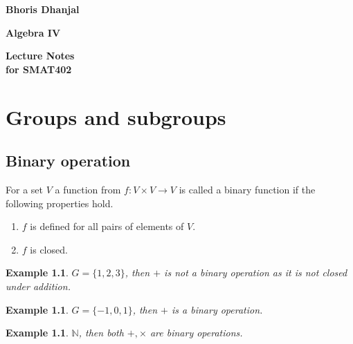 \documentclass[oneside,11pt,pdftex]{book}%
\numberwithin{equation}{section}
\newtheorem{example}[theorem]{Example}
\numberwithin{section}{chapter}
\numberwithin{equation}{chapter}
\newcommand{\N}{\mathbb{N}}
\begin{document}
	
	
	\frontmatter

\thispagestyle{empty}
\begin{flushright}
{\LARGE \textbf{Bhoris Dhanjal}}%
\end{flushright}
\vfill
\begin{center}
{\fontsize{29.86truept}{0truept}\selectfont \textbf{Algebra IV}}%
\end{center}
\vfill
\begin{flushleft}
{\LARGE \textbf{Lecture Notes}} \\
\hspace{-1.75truept}
{\large \textbf{for SMAT402}}
\end{flushleft}
\newpage

\tableofcontents


\mainmatter

\chapter{Groups and subgroups}
\section{Binary operation}
For a set $ V $ a function from $ f:V \times V \rightarrow V $ is called a binary function if the following properties hold.
\begin{enumerate}
	\item $ f $ is defined for all pairs of elements of $ V $.
	\item $ f $ is closed.
\end{enumerate}

\begin{example}
	$ G=\{1,2,3\} $, then $+ $ is not a binary operation as it is not closed under addition.
\end{example}

\begin{example}
	$ G=\{-1,0,1\} $, then $+ $ is a binary operation.
\end{example}

\begin{example}
	$ \N $, then both $ +, \times $ are binary operations.
\end{example}
\end{document}
